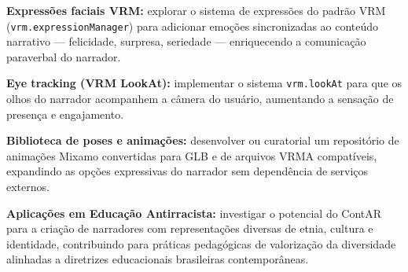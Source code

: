 \documentclass[
  12pt,
  openright,
  twoside,
  a4paper,
  english,
  brazil
]{abntex2}
\begin{document}
\textbf{Expressões faciais VRM:} explorar o sistema de expressões do
padrão VRM (\texttt{vrm.expressionManager}) para adicionar emoções
sincronizadas ao conteúdo narrativo — felicidade, surpresa, seriedade —
enriquecendo a comunicação paraverbal do narrador.

\textbf{Eye tracking (VRM LookAt):} implementar o sistema
\texttt{vrm.lookAt} para que os olhos do narrador acompanhem a câmera
do usuário, aumentando a sensação de presença e engajamento.

\textbf{Biblioteca de poses e animações:} desenvolver ou curatorial um
repositório de animações Mixamo convertidas para GLB e de arquivos VRMA
compatíveis, expandindo as opções expressivas do narrador sem dependência
de serviços externos.

\textbf{Aplicações em Educação Antirracista:} investigar o potencial do
ContAR para a criação de narradores com representações diversas de etnia,
cultura e identidade, contribuindo para práticas pedagógicas de valorização
da diversidade alinhadas a diretrizes educacionais brasileiras contemporâneas.


\postextual




%
%
%
%
\end{document}

